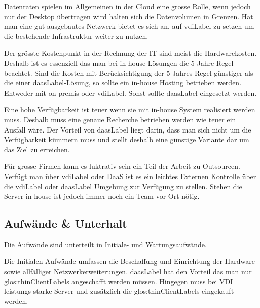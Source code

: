 Datenraten spielen im Allgemeinen in der Cloud eine grosse Rolle, wenn jedoch nur der Desktop übertragen wird halten sich die Datenvolumen in Grenzen. Hat man eine gut ausgebautes Netzwerk bietet es sich an, auf \Gls{vdiLabel} zu setzen um die bestehende Infrastruktur weiter zu nutzen.

Der grösste Kostenpunkt in der Rechnung der IT sind meist die Hardwarekosten. Deshalb ist es essenziell das man bei in-house Lösungen die 5-Jahre-Regel beachtet. Sind die Kosten mit Berücksichtigung der 5-Jahres-Regel günstiger als die einer \Gls{daasLabel}-Lösung, so sollte ein in-house Hosting betrieben werden. Entweder mit on-premis oder \Gls{vdiLabel}. Sonst sollte \Gls{daasLabel} eingesetzt werden.

Eine hohe Verfügbarkeit ist teuer wenn sie mit in-house System realisiert werden muss. Deshalb muss eine genaue Recherche betrieben werden wie teuer ein Ausfall wäre. Der Vorteil von \Gls{daasLabel} liegt darin, dass man sich nicht um die Verfügbarkeit kümmern muss und stellt deshalb eine günstige Variante dar um das Ziel zu erreichen.

Für grosse Firmen kann es luktrativ sein ein Teil der Arbeit zu Outsourcen. Verfügt man über \Gls{vdiLabel} oder DaaS ist es ein leichtes Externen Kontrolle über die \Gls{vdiLabel} oder \Gls{daasLabel} Umgebung zur Verfügung zu stellen. Stehen die Server in-house ist jedoch immer noch ein Team vor Ort nötig.

\subsection{Aufwände \& Unterhalt}




Die Aufwände sind unterteilt in Initiale- und Wartungsaufwände.

Die Initialen-Aufwände umfassen die Beschaffung und Einrichtung der Hardware sowie allfälliger Netzwerkerweiterungen. \Gls{daasLabel} hat den Vorteil das man nur \glspl{glos:thinClientLabel} angeschafft werden müssen. Hingegen muss bei VDI leistungs-starke Server und zusätzlich die \glspl{glos:thinClientLabel} eingekauft werden.

